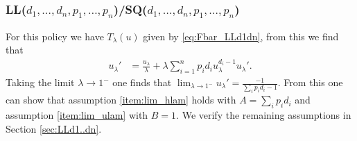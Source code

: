 \documentclass[12pt]{report}
\begin{document}
\subsubsection{LL($d_1,\dots, d_n, p_1,\dots, p_n$)/SQ($d_1,\dots, d_n, p_1,\dots, p_n$)}
For this policy we have $T_\lambda(u)$ given by \eqref{eq:Fbar_LLd1dn}, from this we find that
\begin{align*}
u_{\lambda}'
&= \frac{u_{\lambda}}{\lambda} + \lambda \sum_{i=1}^n p_i d_i u_{\lambda}^{d_i-1} u_{\lambda}'.
\end{align*}
Taking the limit $\lambda \rightarrow 1^-$ one finds that $\lim_{\lambda\rightarrow 1^-} u_\lambda' = \frac{-1}{\sum_i p_i d_i -1}$. From this one can show that assumption \ref{item:lim_hlam} holds with $A = \sum_i p_i d_i$ and assumption \ref{item:lim_ulam} with $B=1$. We verify the remaining assumptions in Section \ref{sec:LLd1..dn}.
\end{document}

